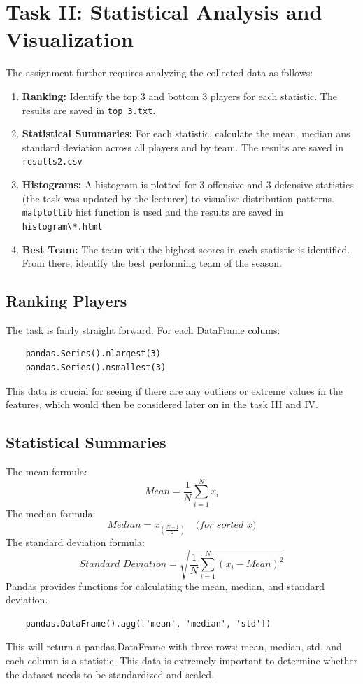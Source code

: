 \documentclass{report}
\begin{document}
\section{Task II: Statistical Analysis and Visualization}
The assignment further requires analyzing the collected data as follows:
\begin{enumerate}
    \item \textbf{Ranking:} Identify the top 3 and bottom 3 players for each statistic. 
    The results are saved in \verb|top_3.txt|.
    \item \textbf{Statistical Summaries:} For each statistic, calculate the mean, median ans 
    standard deviation across all players and by team. The results are saved in \verb|results2.csv|
    \item \textbf{Histograms:} A histogram is plotted for 3 offensive and 3 defensive statistics
    (the task was updated by the lecturer) to visualize distribution patterns. \verb|matplotlib|
    hist function is used and the results are saved in \verb|histogram\*.html|
    \item \textbf{Best Team:} The team with the highest scores in each statistic is identified. 
    From there, identify the best performing team of the season.
\end{enumerate}

\subsection{Ranking Players}
The task is fairly straight forward. For each DataFrame colums:
\begin{verbatim}
    pandas.Series().nlargest(3) 
    pandas.Series().nsmallest(3) 
\end{verbatim}
This data is crucial for seeing if there are any outliers or extreme values in the features, which
would then be considered later on in the task III and IV.

\subsection{Statistical Summaries}
The mean formula: 
\[Mean = \frac{1}{N} \sum_{i=1}^{N} x_i\]
The median formula: 
\[Median = x_{\left(\frac{N+1}{2}\right)} \quad \textit{(for sorted x)}\]
The standard deviation formula: 
\[\textit{Standard Deviation} = \sqrt{\frac{1}{N} \sum_{i=1}^{N} (x_i - Mean)^2}\]
Pandas provides functions for calculating the mean, median, and standard deviation.
\begin{verbatim}
    pandas.DataFrame().agg(['mean', 'median', 'std'])
\end{verbatim}
This will return a pandas.DataFrame with three rows: mean, median, std, and each column is a statistic.
This data is extremely important to determine whether the dataset needs to be standardized and 
scaled.
\end{document}

